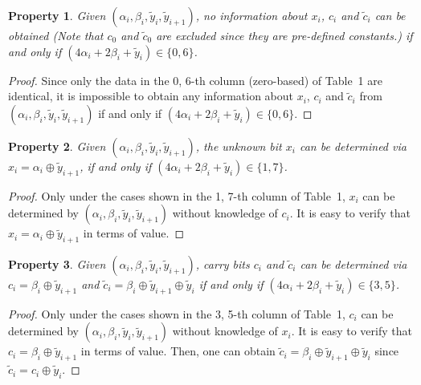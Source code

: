 \documentclass{ws-ijbc}
\newtheorem{property}{Property}
\begin{document}
\begin{property}
Given $(\alpha_i, \beta_i, \tilde{y}_{i}, \tilde{y}_{i+1})$, no information about $x_i$, $c_i$ and $\tilde{c}_i$ can be obtained (Note that $c_0$ and $\tilde{c}_0$ are excluded since they are pre-defined constants.) if and only if $(4\alpha_i+2\beta_i+\tilde{y}_i)\in \{0, 6\}$.
\end{property}
\begin{proof}
Since only the data in the 0, 6-th column (zero-based) of Table~1 are identical, it is impossible to obtain any information about $x_i$, $c_i$ and $\tilde{c}_i$ from $(\alpha_i, \beta_i, \tilde{y}_{i}, \tilde{y}_{i+1})$ if and only if $(4\alpha_i+2\beta_i+\tilde{y}_i)\in \{0, 6\}$.
\end{proof}

\begin{property}
Given $(\alpha_i, \beta_i, \tilde{y}_{i}, \tilde{y}_{i+1})$, the unknown bit $x_i$ can be determined via $x_i=\alpha_i\oplus\tilde{y}_{i+1}$, if and only if
$(4\alpha_i+2\beta_i+\tilde{y}_i)\in \{1, 7\}$.
\end{property}
\begin{proof}
Only under the cases shown in the 1, 7-th column of Table~1, $x_i$ can be determined by $(\alpha_i, \beta_i, \tilde{y}_{i}, \tilde{y}_{i+1})$ without knowledge of $c_i$. It is easy to verify that $x_i=\alpha_i\oplus\tilde{y}_{i+1}$ in terms of value.
\end{proof}

\begin{property}
Given $(\alpha_i, \beta_i, \tilde{y}_i, \tilde{y}_{i+1})$, carry bits $c_i$ and $\tilde{c}_i$ can be determined via $c_i=\beta_i\oplus \tilde{y}_{i+1}$ and
$\tilde{c}_i=\beta_i\oplus \tilde{y}_{i+1}\oplus \tilde{y}_{i}$ if and only if
$(4\alpha_i+2\beta_i+\tilde{y}_i)\in \{3, 5\}$.
\end{property}
\begin{proof}
Only under the cases shown in the 3, 5-th column of Table~1, $c_i$ can be determined by $(\alpha_i, \beta_i, \tilde{y}_{i}, \tilde{y}_{i+1})$ without knowledge of $x_i$. It is easy to verify that $c_i=\beta_i\oplus \tilde{y}_{i+1}$ in terms of value. Then, one can obtain $\tilde{c}_i=\beta_i\oplus \tilde{y}_{i+1}\oplus \tilde{y}_{i}$ since $\tilde{c}_i=c_i\oplus \tilde{y}_{i}$.
\end{proof}
\end{document}
